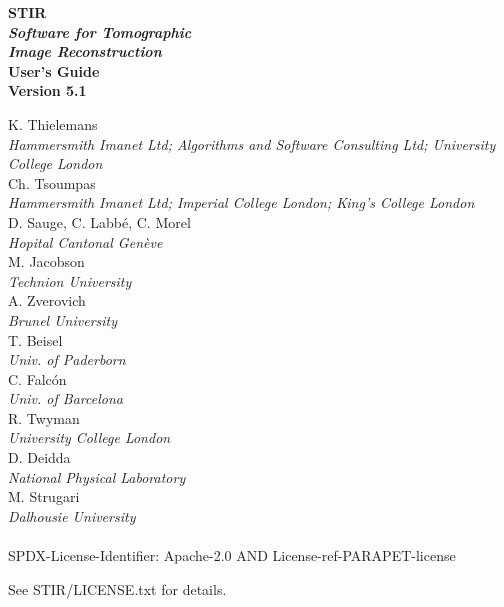\documentclass{article}
\begin{document}
\begin{spacing}{2}
\begin{center}

\textbf{
{\Huge  STIR} 
\huge
\\[1cm]
\textit{ Software for  Tomographic \\ Image Reconstruction}
}
\\[3cm]

\textbf{{\huge User's Guide\\
 Version 5.1}}
\end{center}

\end{spacing}

\large 

\noindent 
K. Thielemans \\
{\it \small Hammersmith Imanet Ltd; Algorithms and Software Consulting Ltd; University College London}\\
Ch. Tsoumpas\\ 
{\it \small Hammersmith Imanet Ltd; Imperial College London; King's College London}\\
D. Sauge, C. Labb\'e, C. Morel \\
{\it \small Hopital Cantonal Gen\`eve}\\
M. Jacobson \\
{\it \small Technion University}\\
A. Zverovich \\
{\it \small Brunel University} \\
T. Beisel \\
{\it \small Univ. of Paderborn} \\
C. Falc\'{o}n \\
{\it \small Univ. of Barcelona} \\
R. Twyman \\
{\it \small University College London}\\
D. Deidda \\
{\it \small National Physical Laboratory}\\
M. Strugari \\
{\it \small Dalhousie University}
\\
\\

SPDX-License-Identifier: Apache-2.0 AND License-ref-PARAPET-license

See STIR/LICENSE.txt for details.

\newpage

\normalsize

\tableofcontents
\end{document}
